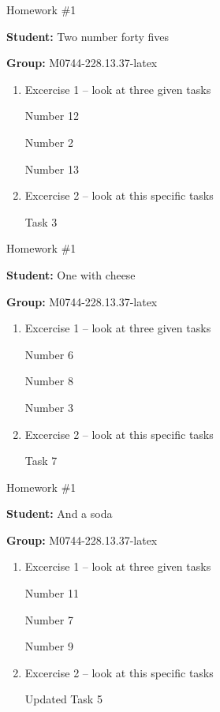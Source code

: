 \documentclass[12pt, fleqn, a4paper]{article}
\newcommand{\preamble}{\lipsum[1]}
\newcommand{\generatepage}[4]{
	\begin{center}
		{\Large #1}

		\textbf{Student:} #2

		\textbf{Group:} #3

	\end{center}

	\vspace{10pt}

	\preamble

	\begin{enumerate}
		#4
	\end{enumerate}

	\pagebreak
}
\begin{document}
	\generatepage{Homework \#1}{Two number forty fives}{M0744-228.13.37-latex}{
		\item Excercise 1 -- look at three given tasks

			Number 12

			Number 2

			Number 13
		\item Excercise 2 -- look at this specific tasks

			Task 3
	}

	\generatepage{Homework \#1}{One with cheese}{M0744-228.13.37-latex}{
		\item Excercise 1 -- look at three given tasks

			Number 6

			Number 8

			Number 3
		\item Excercise 2 -- look at this specific tasks

			Task 7
	}

	\generatepage{Homework \#1}{And a {\LARGE soda}}{M0744-228.13.37-latex}{
		\item Excercise 1 -- look at three given tasks

			Number 11

			Number 7

			Number 9
		\item Excercise 2 -- look at this specific tasks

			Updated Task 5
	}
\end{document}
